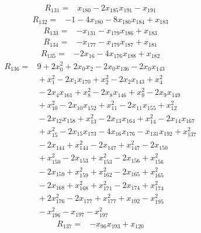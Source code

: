 {%
\begin{align*}
R_{131} ={}& x_{180} - 2x_{185} x_{191} - x_{191}
\end{align*}
\begin{align*}
R_{132} ={}& -1 - 4x_{180} - 8x_{180} x_{184} + x_{183}
\end{align*}
\begin{align*}
R_{133} ={}& -x_{131} - x_{179} x_{186} + x_{183}
\end{align*}
\begin{align*}
R_{134} ={}& -x_{177} - x_{179} x_{187} + x_{181}
\end{align*}
\begin{align*}
R_{135} ={}& -2x_{16} - 4x_{176} x_{188} + x_{182}
\end{align*}
\begin{align*}
R_{136} ={}& 9 + 2x_{0}^{2} + 2x_{0} x_{2} - 2x_{0} x_{136} - 2x_{0} x_{143} \\
&{}  + x_{1}^{2} - 2x_{1} x_{170} + x_{2}^{2} - 2x_{2} x_{143} + x_{4}^{2} \\
&{}  - 2x_{4} x_{161} + x_{8}^{2} - 2x_{8} x_{146} + x_{9}^{2} - 2x_{9} x_{149} \\
&{}  + x_{10}^{2} - 2x_{10} x_{152} + x_{11}^{2} - 2x_{11} x_{155} + x_{12}^{2} \\
&{}  - 2x_{12} x_{158} + x_{13}^{2} - 2x_{13} x_{164} + x_{14}^{2} - 2x_{14} x_{167} \\
&{}  + x_{15}^{2} - 2x_{15} x_{173} - 4x_{16} x_{176} - x_{131} x_{192} + x_{137}^{2} \\
&{}  - 2x_{144} + x_{144}^{2} - 2x_{147} + x_{147}^{2} - 2x_{150} \\
&{}  + x_{150}^{2} - 2x_{153} + x_{153}^{2} - 2x_{156} + x_{156}^{2} \\
&{}  - 2x_{159} + x_{159}^{2} + x_{162}^{2} - 2x_{165} + x_{165}^{2} \\
&{}  - 2x_{168} + x_{168}^{2} + x_{171}^{2} - 2x_{174} + x_{174}^{2} \\
&{}  + 2x_{176}^{2} - 2x_{177} + x_{177}^{2} + x_{192} - x_{195}^{2} \\
&{}  - x_{196}^{2} - x_{197} - x_{197}^{2}
\end{align*}
\begin{align*}
R_{137} ={}& -x_{96} x_{193} + x_{120}

\end{align*}}
